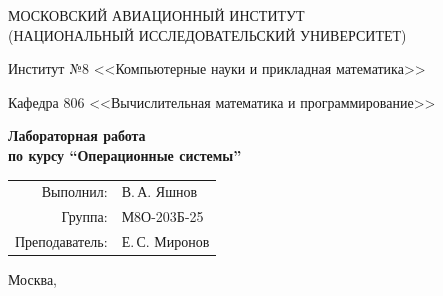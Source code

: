 \begin{titlepage}
\begin{center}
\large
МОСКОВСКИЙ АВИАЦИОННЫЙ ИНСТИТУТ\\ (НАЦИОНАЛЬНЫЙ ИССЛЕДОВАТЕЛЬСКИЙ УНИВЕРСИТЕТ)

\vspace{20pt}

Институт №8 <<Компьютерные науки и прикладная математика>>

Кафедра 806 <<Вычислительная математика и программирование>>
\end{center}

\vspace{60pt}

\begin{center}
\bfseries
\large
Лабораторная работа  \\по курсу \enquote{Операционные системы}

\vspace{54pt}

\end{center}

\vfill

\begin{flushright}
\large
\begin{tabular}{rl}
Выполнил: & В.\,А. Яшнов \\
Группа: & М8О-203Б-25 \\
Преподаватель: & Е.\,С. Миронов \\
\end{tabular}
\end{flushright}

\vspace{92pt}

\begin{center}
\large
Москва, \the\year
\end{center}
\end{titlepage}

\pagebreak